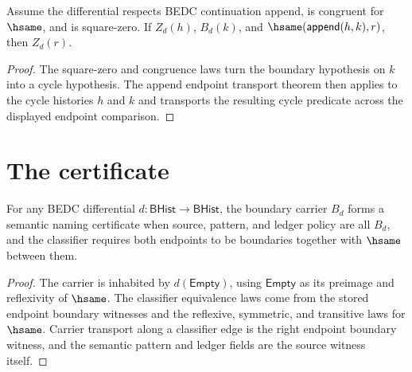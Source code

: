 \begin{theorem}
\label{thm:homology-cycle-boundary-append-cycle-hsame-transport}
Assume the differential respects BEDC continuation append, is congruent for
$\hsame$, and is square-zero. If $Z_d(h)$, $B_d(k)$, and
$\hsame(\mathsf{append}(h,k),r)$, then $Z_d(r)$.
\end{theorem}
\begin{proof}
The square-zero and congruence laws turn the boundary hypothesis on $k$ into
a cycle hypothesis. The append endpoint transport theorem then applies to
the cycle histories $h$ and $k$ and transports the resulting cycle predicate
across the displayed endpoint comparison.
\end{proof}

\section{The certificate}
\label{sec:homology-certificate}

\begin{theorem}
\label{thm:homology-boundary-carrier-semantic-namecert}
For any BEDC differential $d:\mathsf{BHist}\to\mathsf{BHist}$, the boundary
carrier $B_d$ forms a semantic naming certificate when source, pattern, and
ledger policy are all $B_d$, and the classifier requires both endpoints to be
boundaries together with $\hsame$ between them.
\end{theorem}
\begin{proof}
The carrier is inhabited by $d(\mathsf{Empty})$, using $\mathsf{Empty}$ as
its preimage and reflexivity of $\hsame$. The classifier equivalence laws
come from the stored endpoint boundary witnesses and the reflexive, symmetric,
and transitive laws for $\hsame$. Carrier transport along a classifier edge is
the right endpoint boundary witness, and the semantic pattern and ledger
fields are the source witness itself.
\end{proof}

